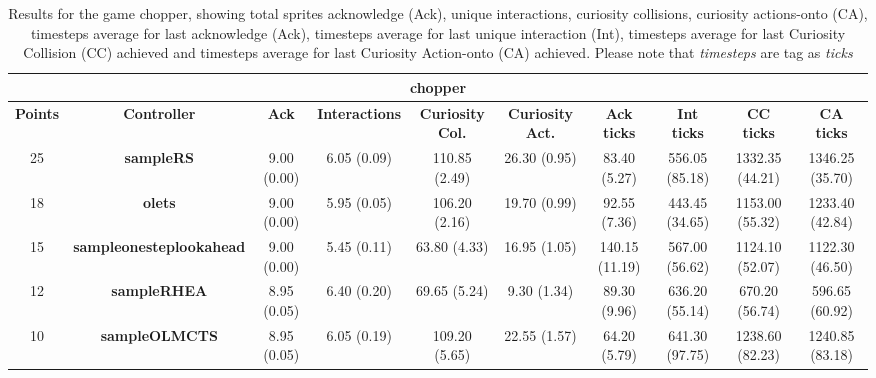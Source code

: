 \begin{table*}[!t]
\begin{center}
\begin{adjustbox}{width=1\textwidth}
\begin{tabular}{|c|c|c|c|c|c|c|c|c|c|}
\multicolumn{10}{c}{\textbf{chopper}}\\
\hline
\textbf{Points} & \textbf{Controller} & \textbf{Ack} & \textbf{Interactions} & \textbf{Curiosity Col.} & \textbf{Curiosity Act.} & \textbf{Ack ticks} & \textbf{Int ticks} & \textbf{CC ticks} & \textbf{CA ticks}\\
\hline
25 & \textbf{sampleRS} & 9.00 (0.00) & 6.05 (0.09) & 110.85 (2.49) & 26.30 (0.95) & 83.40 (5.27) & 556.05 (85.18) & 1332.35 (44.21) & 1346.25 (35.70)
 \\
\hline
18 & \textbf{olets} & 9.00 (0.00) & 5.95 (0.05) & 106.20 (2.16) & 19.70 (0.99) & 92.55 (7.36) & 443.45 (34.65) & 1153.00 (55.32) & 1233.40 (42.84)
 \\
\hline
15 & \textbf{sampleonesteplookahead} & 9.00 (0.00) & 5.45 (0.11) & 63.80 (4.33) & 16.95 (1.05) & 140.15 (11.19) & 567.00 (56.62) & 1124.10 (52.07) & 1122.30 (46.50)
 \\
\hline
12 & \textbf{sampleRHEA} & 8.95 (0.05) & 6.40 (0.20) & 69.65 (5.24) & 9.30 (1.34) & 89.30 (9.96) & 636.20 (55.14) & 670.20 (56.74) & 596.65 (60.92)
 \\
\hline
10 & \textbf{sampleOLMCTS} & 8.95 (0.05) & 6.05 (0.19) & 109.20 (5.65) & 22.55 (1.57) & 64.20 (5.79) & 641.30 (97.75) & 1238.60 (82.23) & 1240.85 (83.18)
 \\
\hline
\end{tabular}
\end{adjustbox}
\caption{Results for the game chopper, showing total sprites acknowledge (Ack), unique interactions, curiosity collisions, curiosity actions-onto (CA), timesteps average for last acknowledge (Ack),  timesteps average for last unique interaction (Int), timesteps average for last Curiosity Collision (CC) achieved and timesteps average for last Curiosity Action-onto (CA) achieved. Please note that \textit{timesteps} are tag as \textit{ticks}}
\label{tab:weights}
\end{center}
\end{table*}
